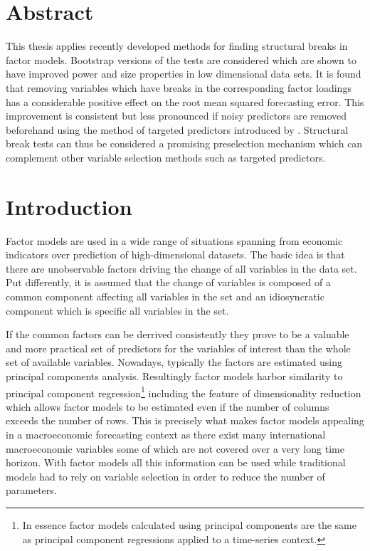 \documentclass[12pt]{article}
\begin{document}
\section*{Abstract}
This thesis applies recently developed methods for finding structural breaks in factor models. Bootstrap versions of the tests are considered which are shown to have improved power and size properties in low dimensional data sets. It is found that removing variables which have breaks in the corresponding factor loadings has a considerable positive effect on the root mean squared forecasting error. This improvement is consistent but less pronounced if noisy predictors are removed beforehand using the method of targeted predictors introduced by \citet{bai2008forecasting}. Structural break tests can thus be considered a promising preselection mechanism which can complement other variable selection methods such as targeted predictors.

\section*{Introduction}
Factor models are used in a wide range of situations spanning from economic indicators over prediction of high-dimensional datasets. The basic idea is that there are unobservable factors driving the change of all variables in the data set. Put differently, it is assumed that the change of variables is composed of a common component affecting all variables in the set and an idiosyncratic component which is specific all variables in the set.

If the common factors can be derrived consistently they prove to be a valuable and more practical set of predictors for the variables of interest than the whole set of available variables. Nowadays, typically the factors are estimated using principal components analysis. Resultingly factor models harbor similarity to principal component regression\footnote{In essence factor models calculated using principal components are the same as principal component regressions applied to a time-series context.} including the feature of dimensionality reduction which allows factor models to be estimated even if the number of columns exceeds the number of rows. This is precisely what makes factor models appealing in a macroeconomic forecasting context as there exist many international macroeconomic variables some of which are not covered over a very long time horizon. With factor models all this information can be used while traditional models had to rely on variable selection in order to reduce the number of parameters.
\end{document}
